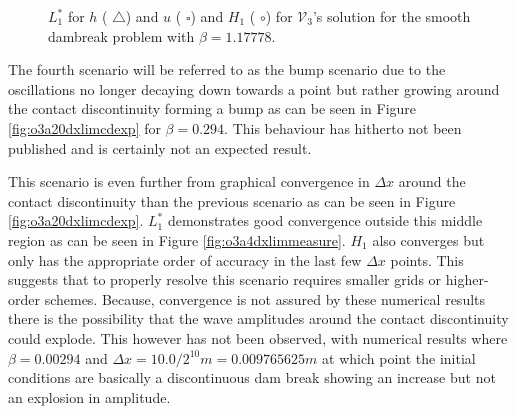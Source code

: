 \documentclass[SingleSpace,12pt,Proceedings]{Serre_ASCE}
\begin{document}
\begin{figure}
\centering
{}
\caption{$L^*_1$ for $h$ ({\color{red} $\triangle$}) and $u$ ({\color{blue} $\square$}) and $H_1$ ({\color{blue} $\circ$}) for $\mathcal{V}_3$'s solution for the smooth dambreak problem with $\beta = 1.17778$.}
\label{fig:o3a3dxlimmeasure}
\end{figure}


The fourth scenario will be referred to as the bump scenario due to the oscillations no longer decaying down towards a point but rather growing around the contact discontinuity forming a bump as can be seen in Figure \ref{fig:o3a20dxlimcdexp} for $\beta = 0.294$. This behaviour has hitherto not been published and is certainly not an expected result. 

This scenario is even further from graphical convergence in $\Delta x$ around the contact discontinuity than the previous scenario as can be seen in Figure \ref{fig:o3a20dxlimcdexp}. $L^*_1$ demonstrates good convergence outside this middle region as can be seen in Figure \ref{fig:o3a4dxlimmeasure}. $H_1$ also converges but only has the appropriate order of accuracy in the last few $\Delta x$ points. This suggests that to properly resolve this scenario requires smaller grids or higher-order schemes. Because, convergence is not assured by these numerical results there is the possibility that the wave amplitudes around the contact discontinuity could explode. This however has not been observed, with numerical results where $\beta = 0.00294$ and $\Delta x = 10.0/ 2^{10}m = 0.009765625m$ at which point the initial conditions are basically a discontinuous dam break showing an increase but not an explosion in amplitude.
\end{document}
